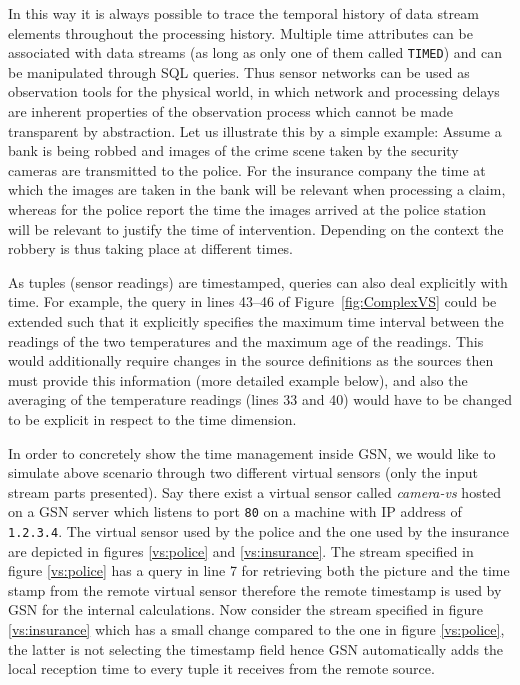 In this way it is always possible to trace the temporal history of
data stream elements throughout the processing history.  Multiple time
attributes can be associated with data streams (as long as only one of them called \texttt{TIMED})
and can be manipulated through SQL queries. Thus sensor networks can be used as observation
tools for the physical world, in which network and processing delays
are inherent properties of the observation process which cannot be
made transparent by abstraction.  Let us illustrate this by a simple
example: Assume a bank is being robbed and images of the crime scene
taken by the security cameras are transmitted to the police. For the
insurance company the time at which the images are taken in the bank
will be relevant when processing a claim, whereas for the police
report the time the images arrived at the police station will be
relevant to justify the time of intervention. Depending on the context
the robbery is thus taking place at different times.

As tuples (sensor readings) are timestamped, queries can also deal
explicitly with time. For example, the query in lines 43--46 of
Figure~\ref{fig:ComplexVS} could be extended such that it explicitly
specifies the maximum time interval between the readings of the two
temperatures and the maximum age of the readings. This would
additionally require changes in the source definitions as the
sources then must provide this information (more detailed example below), and also the
averaging of the temperature readings (lines 33 and 40) would have to
be changed to be explicit in respect to the time dimension.

In order to concretely show the time management inside GSN, we would like to
simulate above scenario through two different virtual sensors (only the input stream parts presented).
Say there exist a virtual sensor called \emph{camera-vs} hosted on a GSN server which listens to port \texttt{80} on a machine with IP address of \texttt{1.2.3.4}.
The virtual sensor used by the police and the one used by the insurance are depicted in figures \ref{vs:police} and \ref{vs:insurance}.
The stream specified in figure \ref{vs:police} has a query in line 7 for retrieving both the picture and the time stamp from the remote virtual sensor therefore
the remote timestamp is used by GSN for the internal calculations. Now consider the stream specified in figure \ref{vs:insurance} which has a small change compared to the one in figure \ref{vs:police}, the latter is not selecting the timestamp field hence GSN automatically adds the local reception time to every tuple it receives from the remote source.

